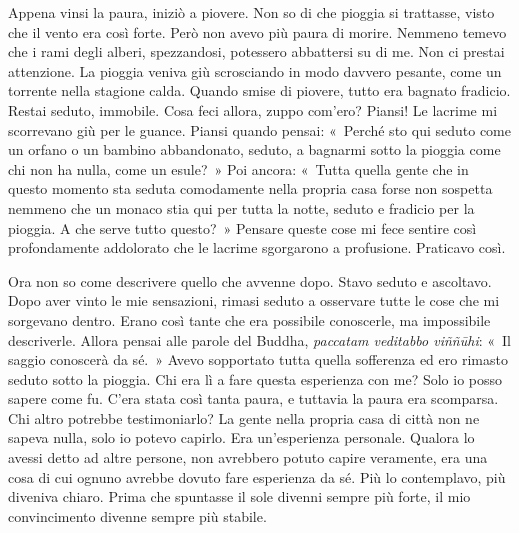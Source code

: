 Appena vinsi la paura, iniziò a piovere. Non so di che pioggia si
trattasse, visto che il vento era così forte. Però non avevo più paura
di morire. Nemmeno temevo che i rami degli alberi, spezzandosi,
potessero abbattersi su di me. Non ci prestai attenzione. La pioggia
veniva giù scrosciando in modo davvero pesante, come un torrente nella
stagione calda. Quando smise di piovere, tutto era bagnato fradicio.
Restai seduto, immobile. Cosa feci allora, zuppo com'ero? Piansi! Le
lacrime mi scorrevano giù per le guance. Piansi quando pensai: «~Perché
sto qui seduto come un orfano o un bambino abbandonato, seduto, a
bagnarmi sotto la pioggia come chi non ha nulla, come un esule?~» Poi
ancora: «~Tutta quella gente che in questo momento sta seduta
comodamente nella propria casa forse non sospetta nemmeno che un monaco
stia qui per tutta la notte, seduto e fradicio per la pioggia. A che
serve tutto questo?~» Pensare queste cose mi fece sentire così
profondamente addolorato che le lacrime sgorgarono a profusione.
Praticavo così.

Ora non so come descrivere quello che avvenne dopo. Stavo seduto e
ascoltavo. Dopo aver vinto le mie sensazioni, rimasi seduto a osservare
tutte le cose che mi sorgevano dentro. Erano così tante che era
possibile conoscerle, ma impossibile descriverle. Allora pensai alle
parole del Buddha, \emph{paccatam veditabbo viññūhi}: «~Il saggio
conoscerà da sé.~» Avevo sopportato tutta quella sofferenza ed ero
rimasto seduto sotto la pioggia. Chi era lì a fare questa esperienza con
me? Solo io posso sapere come fu. C'era stata così tanta paura, e
tuttavia la paura era scomparsa. Chi altro potrebbe testimoniarlo? La
gente nella propria casa di città non ne sapeva nulla, solo io potevo
capirlo. Era un'esperienza personale. Qualora lo avessi detto ad altre
persone, non avrebbero potuto capire veramente, era una cosa di cui
ognuno avrebbe dovuto fare esperienza da sé. Più lo contemplavo, più
diveniva chiaro. Prima che spuntasse il sole divenni sempre più forte,
il mio convincimento divenne sempre più stabile.

